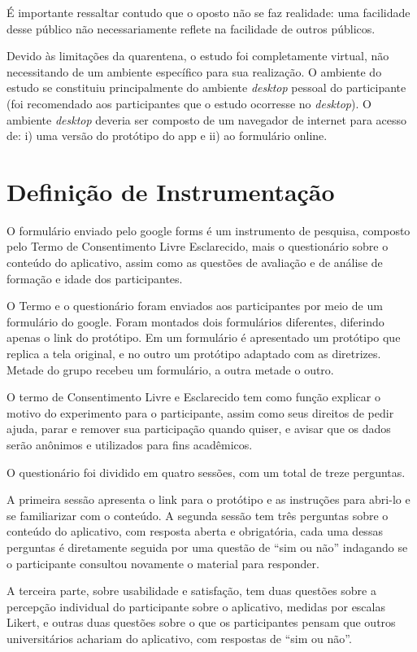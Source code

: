 \documentclass[12pt]{article}
\begin{document}
É importante ressaltar contudo que o oposto não se faz realidade: uma facilidade desse público não necessariamente reflete na facilidade de outros públicos.

Devido às limitações da quarentena, o estudo foi completamente virtual, não necessitando de um ambiente específico para sua realização. O ambiente do estudo se constituiu principalmente do ambiente \textit{desktop} pessoal do participante (foi recomendado aos participantes que o estudo ocorresse no \textit{desktop}). O ambiente \textit{desktop} deveria ser composto de um navegador de internet para acesso de: i) uma versão do protótipo do app e ii) ao formulário online.

\section{Definição de Instrumentação}

O formulário enviado pelo google forms é um instrumento de pesquisa, composto pelo Termo de Consentimento Livre Esclarecido, mais o questionário sobre o conteúdo do aplicativo, assim como as questões de avaliação e de análise de formação e idade dos participantes.

O Termo e o questionário foram enviados aos participantes por meio de um formulário do google. Foram montados dois formulários diferentes, diferindo apenas o link do protótipo. Em um formulário é apresentado um protótipo que replica a tela original, e no outro um protótipo adaptado com as diretrizes. Metade do grupo recebeu um formulário, a outra metade o outro.

O termo de Consentimento Livre e Esclarecido tem como função explicar o motivo do experimento para o participante, assim como seus direitos de pedir ajuda, parar e remover sua participação quando quiser, e avisar que os dados serão anônimos e utilizados para fins acadêmicos.

O questionário foi dividido em quatro sessões, com um total de treze perguntas.

A primeira sessão apresenta o link para o protótipo e as instruções para abri-lo e se familiarizar com o conteúdo. A segunda sessão tem três perguntas sobre o conteúdo do aplicativo, com resposta aberta e obrigatória, cada uma dessas perguntas é diretamente seguida por uma questão de ``sim ou não'' indagando se o participante consultou novamente o material para responder. 

A terceira parte, sobre usabilidade e satisfação, tem duas questões sobre a percepção individual do participante sobre o aplicativo, medidas por escalas Likert, e outras duas questões sobre o que os participantes pensam que outros universitários achariam do aplicativo, com respostas de ``sim ou não''. 
\end{document}
